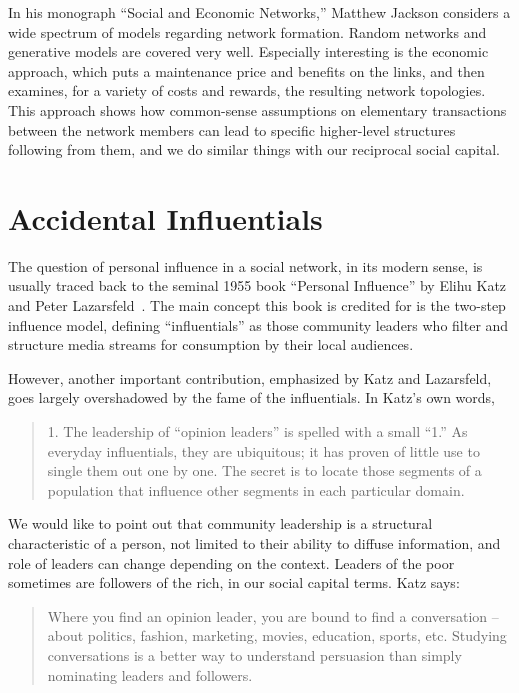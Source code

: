 \documentclass[10pt,oneside]{memoir}
\begin{document}
\begin{Spacing}{2}
In his monograph ``Social and Economic Networks,'' Matthew Jackson considers a wide spectrum of models regarding network formation.  Random networks and generative models are covered very well.  Especially interesting is the economic approach, which puts a maintenance price and benefits on the links, and then examines, for a variety of costs and rewards, the resulting network topologies.  This approach shows how common-sense assumptions on elementary transactions between the network members can lead to specific higher-level structures following from them, and we do similar things with our reciprocal social capital. 


\pagebreak \section{Accidental Influentials}
\label{accidentalinfluentials}

The question of personal influence in a social network, in its modern sense, is usually traced back to the seminal 1955 book ``Personal Influence'' by Elihu Katz and Peter Lazarsfeld~\cite{katz1955influence}.  The main concept this book is credited for is the two-step influence model, defining ``influentials'' as those community leaders who filter and structure media streams for consumption by their local audiences.


However, another important contribution, emphasized by Katz and Lazarsfeld, goes largely overshadowed by the fame of the influentials.  In Katz's own words,


\begin{quote}
1. The leadership of ``opinion leaders'' is spelled with a small ``1.''  As everyday influentials, they are ubiquitous; it has proven of little use to single them out one by one.  The secret is to locate those segments of a population that influence other segments in each particular domain.
\end{quote}


We would like to point out that community leadership is a structural characteristic of a person, not limited to their ability to diffuse information, and role of leaders can change depending on the context.  Leaders of the poor sometimes are followers of the rich, in our social capital terms.  Katz says:


\begin{quote}
Where you find an opinion leader, you are bound to find a conversation -- about politics, fashion, marketing, movies, education, sports, etc.  Studying conversations is a better way to understand persuasion than simply nominating leaders and followers.
\end{quote}



\end{Spacing}
\end{document}
